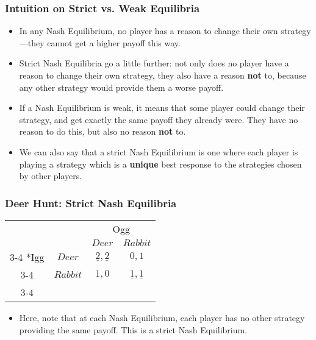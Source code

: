 \begin{frame}
\frametitle{Intuition on Strict vs. Weak Equilibria}
\begin{itemize}
\item In any Nash Equilibrium, no player has a reason to change their own strategy---they cannot get a higher payoff this way.
\item Strict Nash Equilibria go a little further: not only does no player have a reason to change their own strategy, they also have a reason \textbf{not} to, because any other strategy would provide them a worse payoff.
\item If a Nash Equilibrium is weak, it means that some player could change their strategy, and get exactly the same payoff they already were. They have no reason to do this, but also no reason \textbf{not} to.
\item We can also say that a strict Nash Equilibrium is one where each player is playing a strategy which is a \textbf{unique} best response to the strategies chosen by other players.
\end{itemize}
\end{frame}

\begin{frame}
\frametitle{Deer Hunt: Strict Nash Equilibria}
\begin{table}[h]
\centering
\begin{tabular}{cc|c|c|}
& \multicolumn{1}{c}{} & \multicolumn{2}{c}{Ogg}\\
& \multicolumn{1}{c}{} & \multicolumn{1}{c}{$Deer$}  & \multicolumn{1}{c}{$Rabbit$} \\\cline{3-4}
\multirow{2}*{Igg}  & $Deer$ & $\underline{2},\underline{2}$ & $0,1$ \\\cline{3-4}
& $Rabbit$ & $1,0$ & $\underline{1},\underline{1}$ \\\cline{3-4}
\end{tabular}
\end{table}
\begin{itemize}
\item Here, note that at each Nash Equilibrium, each player has no other strategy providing the same payoff. This is a strict Nash Equilibrium.
\end{itemize}
\end{frame}

